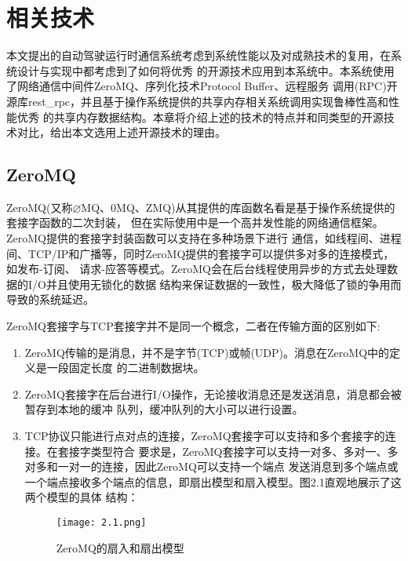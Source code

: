 \chapter{相关技术}
本文提出的自动驾驶运行时通信系统考虑到系统性能以及对成熟技术的复用，在系统设计与实现中都考虑到了如何将优秀
的开源技术应用到本系统中。本系统使用了网络通信中间件ZeroMQ、序列化技术Protocol Buffer、远程服务
调用(RPC)开源库rest\_rpc，并且基于操作系统提供的共享内存相关系统调用实现鲁棒性高和性能优秀
的共享内存数据结构。本章将介绍上述的技术的特点并和同类型的开源技术对比，给出本文选用上述开源技术的理由。
\section{ZeroMQ}
ZeroMQ(又称$\varnothing$MQ、0MQ、ZMQ)从其提供的库函数名看是基于操作系统提供的套接字函数的二次封装\cite{wangpeng}，
但在实际使用中是一个高并发性能的网络通信框架。ZeroMQ提供的套接字封装函数可以支持在多种场景下进行
通信，如线程间、进程间、TCP/IP和广播等，同时ZeroMQ提供的套接字可以提供多对多的连接模式，如发布-订阅、
请求-应答等模式\cite{pfp}。ZeroMQ会在后台线程使用异步的方式去处理数据的I/O并且使用无锁化的数据
结构来保证数据的一致性，极大降低了锁的争用而导致的系统延迟\cite{swp}。

ZeroMQ套接字与TCP套接字并不是同一个概念，二者在传输方面的区别如下:
\begin{enumerate}
    \item ZeroMQ传输的是消息，并不是字节(TCP)或帧(UDP)。消息在ZeroMQ中的定义是一段固定长度
    的二进制数据块。
    \item ZeroMQ套接字在后台进行I/O操作，无论接收消息还是发送消息，消息都会被暂存到本地的缓冲
    队列，缓冲队列的大小可以进行设置。
    \item TCP协议只能进行点对点的连接，ZeroMQ套接字可以支持和多个套接字的连接。在套接字类型符合
    要求是，ZeroMQ套接字可以支持一对多、多对一、多对多和一对一的连接，因此ZeroMQ可以支持一个端点
    发送消息到多个端点或一个端点接收多个端点的信息，即扇出模型和扇入模型。图2.1直观地展示了这两个模型的具体
    结构：
    \begin{figure}[H]
        \centering
        \texttt{[image: 2.1.png]}
        \caption{ZeroMQ的扇入和扇出模型}
        \label{fig:4}
      \end{figure}
\end{enumerate}

